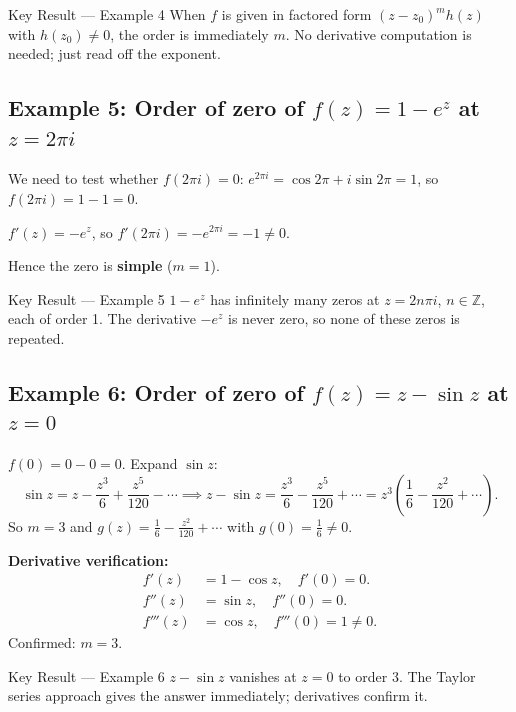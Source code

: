 \documentclass[12pt,a4paper]{article}
\begin{document}
\begin{learnbox}{Key Result --- Example 4}
When $f$ is given in factored form $(z-z_0)^m h(z)$ with $h(z_0)\neq 0$, the order is
immediately $m$. No derivative computation is needed; just read off the exponent.
\end{learnbox}

\subsection*{Example 5: Order of zero of $f(z) = 1 - e^z$ at $z = 2\pi i$}

We need to test whether $f(2\pi i)=0$:
$e^{2\pi i} = \cos 2\pi + i\sin 2\pi = 1$, so $f(2\pi i)=1-1=0$. \checkmark

\medskip
$f'(z) = -e^z$, so $f'(2\pi i)=-e^{2\pi i}=-1\neq 0$.

Hence the zero is \textbf{simple} ($m=1$).

\begin{learnbox}{Key Result --- Example 5}
$1-e^z$ has infinitely many zeros at $z=2n\pi i$, $n\in\mathbb{Z}$, each of order 1.
The derivative $-e^z$ is never zero, so none of these zeros is repeated.
\end{learnbox}

\subsection*{Example 6: Order of zero of $f(z) = z - \sin z$ at $z = 0$}

$f(0)=0-0=0$. Expand $\sin z$:
\[
  \sin z = z - \frac{z^3}{6} + \frac{z^5}{120} - \cdots
  \implies z - \sin z = \frac{z^3}{6} - \frac{z^5}{120} + \cdots = z^3\!\left(\frac{1}{6} - \frac{z^2}{120}+\cdots\right).
\]
So $m=3$ and $g(z)= \tfrac{1}{6} - \tfrac{z^2}{120}+\cdots$ with $g(0)=\tfrac{1}{6}\neq 0$.

\medskip\noindent\textbf{Derivative verification:}
\begin{align*}
  f'(z)   &= 1 - \cos z,\quad f'(0)=0.\\
  f''(z)  &= \sin z,\quad f''(0)=0.\\
  f'''(z) &= \cos z,\quad f'''(0)=1\neq 0.
\end{align*}
Confirmed: $m=3$.

\begin{learnbox}{Key Result --- Example 6}
$z-\sin z$ vanishes at $z=0$ to order 3. The Taylor series approach gives the answer
immediately; derivatives confirm it.
\end{learnbox}
\end{document}

